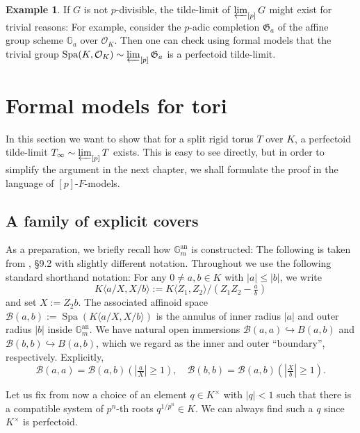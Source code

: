 \documentclass[10pt,oneside]{amsart}
\theoremstyle{definition}
\newtheorem*{example}{Example}
\begin{document}
	
	\begin{example}
		If $G$ is not $p$-divisible, the tilde-limit of $\varprojlim_{[p]}G$ might exist for trivial reasons: For example, consider the $p$-adic completion  $\mathfrak G_a$  of the affine group scheme $\mathbb G_a$ over $\mathcal O_K$. Then one can check using formal models that the trivial group $\operatorname{Spa}(K,\mathcal O_K)\sim \varprojlim_{[p]}\mathfrak G_a$ is a perfectoid tilde-limit.
	\end{example}
	
 
 
	
 
	
		



	\section{Formal models for tori}
	
	In this section we want to show that for a split rigid torus $T$ over $K$, a perfectoid tilde-limit $T_\infty\sim \varprojlim_{[p]}T$ exists. This is easy to see directly, but in order to simplify the argument in the next chapter, we shall formulate the proof in the language of $[p]$-$F$-models.
	
	\subsection{A family of explicit covers}
	As a preparation, we briefly recall how $\mathbb G_m^{\operatorname{an}}$ is constructed: The following is taken from \cite{Bosch lectures}, \S 9.2 with slightly different notation. Throughout we use the following standard shorthand notation: For any $0\ne a,b\in K$ with $|a|\leq |b|$, we write
	\[K\langle a/X,X/b\rangle := K\langle Z_1,Z_2\rangle/(Z_1Z_2-\tfrac{a}{b})\]
	and set $X:=Z_2b$.
	The associated affinoid space $\mathcal B(a,b):=\operatorname{Spa}(K\langle a/X, X/b\rangle)$ is the annulus of inner radius $|a|$ and outer radius $|b|$ inside $\mathbb G_m^{\operatorname{an}}$.
	We have natural open immersions $\mathcal B(a,a)\hookrightarrow B(a,b)$ and $\mathcal B(b,b)\hookrightarrow B(a,b)$, which we regard as the inner and outer ``boundary'', respectively. Explicitly, \[\mathcal B(a,a)=\mathcal B(a,b)(|\tfrac{a}{X}|\geq 1),\quad \mathcal B(b,b)=\mathcal B(a,b)(|\tfrac{X}{b}|\geq 1).\]
	
	Let us fix from now a choice of an element $q\in K^{\times}$ with $|q|<1$ such that there is a compatible system of $p^n$-th roots $q^{1/p^n}\in K$. We can always find such a $q$ since $K^{\times}$ is perfectoid.
	
\end{document}
